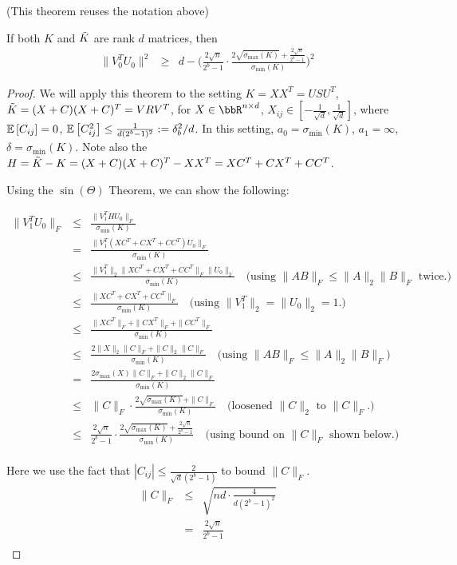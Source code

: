(This theorem reuses the notation above)
\begin{theorem}
If both $K$ and $\tK$ are rank $d$ matrices, then
\begin{eqnarray*}
\|V_0^T U_0\|^2 &\geq& d - \Bigg(\frac{2\sqrt{n}}{2^b-1} \cdot \frac{2\sqrt{\sigma_{\max}(K)} + \frac{2\sqrt{n}}{2^b-1} }{\sigma_{\min}(K)} \Bigg)^2
\end{eqnarray*}
\end{theorem}
\begin{proof}
We will apply this theorem to the setting $K = XX^T = USU^T$, $\tK = (X+C)(X+C)^T = VRV^T$,
for $X \in \RR^{n \times d}$, $X_{ij}\in [-\frac{1}{\sqrt{d}},\frac{1}{\sqrt{d}}]$,
where $\expect{}{C_{ij}} = 0$, $\expect{}{C_{ij}^2} \leq \frac{1}{d(2^b-1)^2} \defeq \delta_b^2/d$.
In this setting, $a_0 = \sigma_{\min}(K)$, $a_1 = \infty$, $\delta=\sigma_{\min}(K)$.
Note also the $H = \tK-K = (X+C)(X+C)^T - XX^T = XC^T + CX^T + CC^T$.

Using the $\sin(\Theta)$ Theorem, we can show the following:

\begin{eqnarray*}
\|V_1^T U_0\|_F
&\leq& \frac{\|V_1^T H U_0\|_F}{\sigma_{\min}(K)}\\
&=& \frac{\|V_1^T (XC^T + CX^T + CC^T) U_0\|_F}{\sigma_{\min}(K)}\\
&\leq& \frac{\|V_1^T\|_2 \|XC^T + CX^T + CC^T\|_F \|U_0\|_2}{\sigma_{\min}(K)} \quad \text{(using $\|AB\|_F \leq \|A\|_2 \|B\|_F$ twice.)}\\
&\leq& \frac{ \|XC^T + CX^T + CC^T\|_F}{\sigma_{\min}(K)} \quad \text{(using $\|V_1^T\|_2 = \|U_0\|_2 = 1$.)}\\
&\leq& \frac{\|XC^T\|_F + \|CX^T\|_F + \|CC^T\|_F}{\sigma_{\min}(K)} \\
&\leq& \frac{2\|X\|_2\|C\|_F + \|C\|_2 \|C\|_F}{\sigma_{\min}(K)} \quad \text{(using $\|AB\|_F \leq \|A\|_2 \|B\|_F$)}\\
&=& \frac{2\sigma_{\max}(X)\|C\|_F + \|C\|_2 \|C\|_F}{\sigma_{\min}(K)} \\
&\leq& \|C\|_F \cdot \frac{2\sqrt{\sigma_{\max}(K)} + \|C\|_F }{\sigma_{\min}(K)}  \quad \text{(loosened $\|C\|_2$ to  $\|C\|_F$.)}\\
&\leq& \frac{2\sqrt{n}}{2^b-1} \cdot \frac{2\sqrt{\sigma_{\max}(K)} + \frac{2\sqrt{n}}{2^b-1} }{\sigma_{\min}(K)} \quad \text{(using bound on $\|C\|_F$ shown below.)} \\
\end{eqnarray*}

Here we use the fact that $|C_{ij}| \leq \frac{2}{\sqrt{d}(2^b-1)}$ to bound $\|C\|_F$.
\begin{eqnarray*}
\|C\|_F &\leq& \sqrt{nd \cdot \frac{4}{d(2^b-1)^2}} \\
&=& \frac{2\sqrt{n}}{2^b-1} \\
\end{eqnarray*}


\end{proof}
